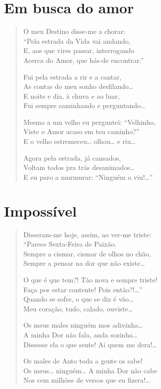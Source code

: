\chapter{Em busca do amor}

\begin{verse}
O meu Destino disse-me a chorar:\\
“Pela estrada da Vida vai andando,\\
E, aos que vires passar, interrogando\\
Acerca do Amor, que hás-de encontrar.”

Fui pela estrada a rir e a cantar,\\
As contas do meu sonho desfilando\ldots{}\\
E noite e dia, à chuva e ao luar,\\
Fui sempre caminhando e perguntando\ldots{}

Mesmo a um velho eu perguntei: “Velhinho,\\
Viste o Amor acaso em teu caminho?”\\
E o velho estremeceu\ldots{} olhou\ldots{} e riu\ldots{}

Agora pela estrada, já cansados,\\
Voltam todos pra trás desanimados\ldots{}\\
E eu paro a murmurar: “Ninguém o viu!\ldots{}”
\end{verse}

\chapter{Impossível}

\begin{verse}
Disseram-me hoje, assim, ao ver-me triste:\\
“Parece Sexta-Feira de Paixão.\\
Sempre a cismar, cismar de olhos no chão,\\
Sempre a pensar na dor que não existe\ldots{}

O que é que tem?! Tão nova e sempre triste!\\
Faça por estar contente! Pois então?!\ldots{}”\\
Quando se sofre, o que se diz é vão\ldots{}\\
Meu coração, tudo, calado, ouviste\ldots{}

Os meus males ninguém mos adivinha\ldots{}\\
A minha Dor não fala, anda sozinha\ldots{}\\
Dissesse ela o que sente! Ai quem me dera!\ldots{}

Os males de Anto toda a gente os sabe!\\
Os meus\ldots{} ninguém\ldots{} A minha Dor não cabe\\
Nos cem milhões de versos que eu fizera!\ldots{}
\end{verse}
